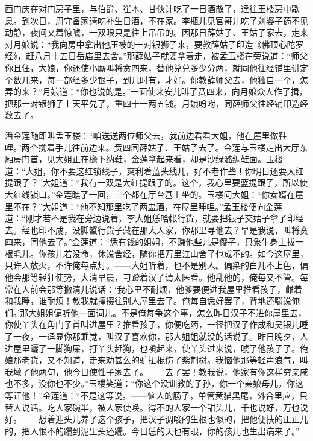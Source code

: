 西门庆在对门房子里，与伯爵、崔本、甘伙计吃了一日酒散了，迳往玉楼房中歇息。到次日，周守备家请吃补生日酒，不在家。李瓶儿见官哥儿吃了刘婆子药不见动静，夜间又着惊唬，一双眼只是往上吊吊的。因那日薛姑子、王姑子家去，走来对月娘说：“我向房中拿出他压被的一对银狮子来，要教薛姑子印造《佛顶心陀罗经》，赶八月十五日岳庙里去舍。”那薛姑子就要拿着走，被孟玉楼在旁说道：“师父你且住，大娘，你还使小厮叫将贲四来，替他兑兑多少分两，就同他往经铺里讲定个数儿来，每一部经多少银子，到几时有，才好。你教薛师父去，他独自一个，怎弄的来？”月娘道：“你也说的是。”一面使来安儿叫了贲四来，向月娘众人作了揖，把那一对银狮子上天平兑了，重四十一两五钱。月娘吩咐，同薛师父往经铺印造经数去了。

潘金莲随即叫孟玉楼：“咱送送两位师父去，就前边看看大姐，他在屋里做鞋哩。”两个携着手儿往前边来。贲四同薛姑子、王姑子去了。金莲与玉楼走出大厅东厢房门首，见大姐正在檐下纳鞋，金莲拿起来看，却是沙绿潞绸鞋面。玉楼道：“大姐，你不要这红锁线子，爽利着蓝头线儿，好不老作些！你明日还要大红提跟子？”大姐道：“我有一双是大红提跟子的。这个，我心里要蓝提跟子，所以使大红线锁口。”金莲瞧了一回，三个都在厅台基上坐的。玉楼问大姐：“你女婿在屋里不在？”大姐道：“他不知那里吃了两盅酒，在屋里睡哩。”孟玉楼便向金莲道：“刚才若不是我在旁边说着，李大姐恁哈帐行货，就要把银子交姑子拿了印经去。经也印不成，没脚蟹行货子藏在那大人家，你那里寻他去？早是我说，叫将贲四来，同他去了。”金莲道：“恁有钱的姐姐，不赚他些儿是傻子，只象牛身上拔一根毛儿。你孩儿若没命，休说舍经，随你把万里江山舍了也成不的。如今这屋里，只许人放火，不许俺每点灯。——大姐听着，也不是别人。偏染的白儿不上色，偏他会那等轻狂使势，大清早晨，刁蹬着汉子请太医看。他乱他的，俺每又不管。每常在人前会那等撇清儿说话：‘我心里不耐烦，他爹要便进我屋里推看孩子，雌着和我睡，谁耐烦！教我就撺掇往别人屋里去了。俺每自恁好罢了，背地还嚼说俺们。’那大姐姐偏听他一面词儿。不是俺每争这个事，怎么昨日汉子不进你屋里去，你使丫头在角门子首叫进屋里？推看孩子，你便吃药，一径把汉子作成和吴银儿睡了一夜，一迳显你那乖觉，叫汉子喜欢你，那大姐姐就没的话说了。昨日晚夕，人进屋里躧了一脚狗屎，打丫头赶狗，也嗔起来，使丫头过来说，唬了他孩子了。俺娘那老货，又不知道，走来劝甚么的驴扭棍伤了紫荆树。我恼他那等轻声浪气，叫我墩了他两句，他今日使性子家去了。——去了罢！教我说，他家有你这样穷亲戚也不多，没你也不少。”玉楼笑道：“你这个没训教的子孙，你一个亲娘母儿，你这等讧他！”金莲道：“不是这等说。——恼人的肠子，单管黄猫黑尾，外合里应，只替人说话。吃人家碗半，被人家使唤。得不的人家一个甜头儿，千也说好，万也说好。——想着迎头儿养了这个孩子，把汉子调唆的生根也似的，把他便扶的正正儿的，把人恨不的躧到泥里头还躧。今日恁的天也有眼，你的孩儿也生出病来了。”

